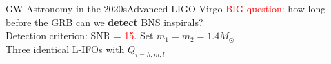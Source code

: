 \documentclass[xcolor=dvipsnames,t]{beamer}
\newcommand{\red}[1]{\textcolor{red}{#1}}
\newcommand{\f}{\frac}
\begin{document}
\begin{frame}{GW Astronomy in the 2020s}{Advanced LIGO-Virgo}
  \red{BIG question:} how long before the GRB can we {\bf detect} BNS inspirals?\\
  Detection criterion: SNR = \red{15}. Set $m_1=m_2=1.4 M_\odot$\\
  Three identical L-IFOs with $Q_{i=h,m,l}$
 
\end{frame}
\end{document}
